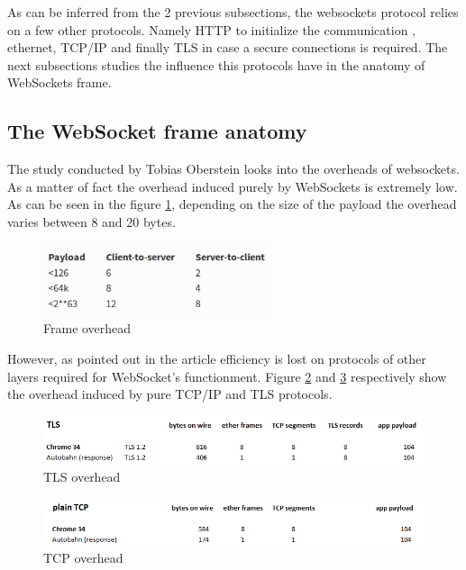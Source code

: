 As can be inferred from the 2 previous subsections, the websockets protocol
relies on a few other protocols. Namely HTTP to initialize the communication ,
ethernet, TCP/IP and finally TLS in case a secure connections is required.  The
next subsections studies the influence this protocols have in the anatomy of
WebSockets frame.

\subsection{The WebSocket frame anatomy}

The study conducted by Tobias Oberstein \citep{Reference30} looks into the
overheads of websockets. As a matter of fact the overhead induced purely by
WebSockets is extremely low. As can be seen in the figure
\ref{fig:frameOverhead}, depending on the size of the payload the overhead
varies between 8 and 20 bytes.

\begin{figure}[H]
\centering
\includegraphics[width=0.6\textwidth]{./Figures/frame_overhead.png}
\caption[Frame overhead]{Frame overhead \citep{Reference30}}
\label{fig:frameOverhead}
\end{figure}

However, as pointed out in the article efficiency is lost on protocols of other layers
required for WebSocket's functionment. Figure \ref{fig:tlsOverhead} and
\ref{fig:tcpOverhead} respectively show the overhead induced by pure TCP/IP and
TLS protocols.

\begin{figure}[H]
\centering
\includegraphics[width=\textwidth]{./Figures/tls_overhead.png}
\caption[TLS overhead]{TLS overhead \citep{Reference30}}
\label{fig:tlsOverhead}
\end{figure}

\begin{figure}[H]
\centering
\includegraphics[width=\textwidth]{./Figures/tcp_overhead.png}
\caption[TCP overhead]{TCP overhead \citep{Reference30}}
\label{fig:tcpOverhead}
\end{figure}


